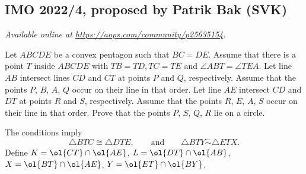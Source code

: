 \documentclass[11pt]{scrartcl}
\begin{document}
\subsection{IMO 2022/4, proposed by Patrik Bak (SVK)}
\textsl{Available online at \url{https://aops.com/community/p25635154}.}
\begin{mdframed}[style=mdpurplebox,frametitle={Problem statement}]
Let $ABCDE$ be a convex pentagon such that $BC=DE$.
Assume that there is a point $T$ inside $ABCDE$ with $TB=TD,TC=TE$ and $\angle ABT = \angle TEA$.
Let line $AB$ intersect lines $CD$ and $CT$ at points $P$ and $Q$, respectively.
Assume that the points $P$, $B$, $A$, $Q$ occur on their line in that order.
Let line $AE$ intersect $CD$ and $DT$ at points $R$ and $S$, respectively.
Assume that the points $R$, $E$, $A$, $S$ occur on their line in that order.
Prove that the points $P$, $S$, $Q$, $R$ lie on a circle.
\end{mdframed}
The conditions imply
\[ \triangle BTC \cong \triangle DTE,
  \qquad\text{and}\qquad
  \triangle BTY \overset{-}{\sim} \triangle ETX. \]
Define $K = \ol{CT} \cap \ol{AE}$, $L = \ol{DT} \cap \ol{AB}$,
$X = \ol{BT} \cap \ol{AE}$, $Y = \ol{ET} \cap \ol{BY}$.
\end{document}
